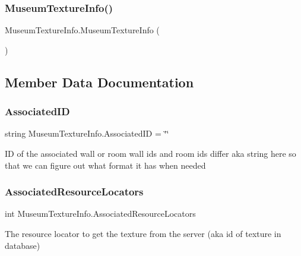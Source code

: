 \subsubsection{\texorpdfstring{Museum\+Texture\+Info()}{MuseumTextureInfo()}}
{\footnotesize\ttfamily Museum\+Texture\+Info.\+Museum\+Texture\+Info (\begin{DoxyParamCaption}{ }\end{DoxyParamCaption})}



\subsection{Member Data Documentation}
\mbox{\label{class_museum_texture_info_a31425831c498a46842b2cce06e629183}} 
\subsubsection{\texorpdfstring{Associated\+ID}{AssociatedID}}
{\footnotesize\ttfamily string Museum\+Texture\+Info.\+Associated\+ID = \char`\"{}\char`\"{}}



ID of the associated wall or room wall ids and room ids differ aka string here so that we can figure out what format it has when needed 

\mbox{\label{class_museum_texture_info_a5b0c9f041422a931cab7b3de689fe44e}} 
\subsubsection{\texorpdfstring{Associated\+Resource\+Locators}{AssociatedResourceLocators}}
{\footnotesize\ttfamily int Museum\+Texture\+Info.\+Associated\+Resource\+Locators}



The resource locator to get the texture from the server (aka id of texture in database) 

\mbox{\label{class_museum_texture_info_aaa15a48a616e6212ead2dd506f452974}} 
